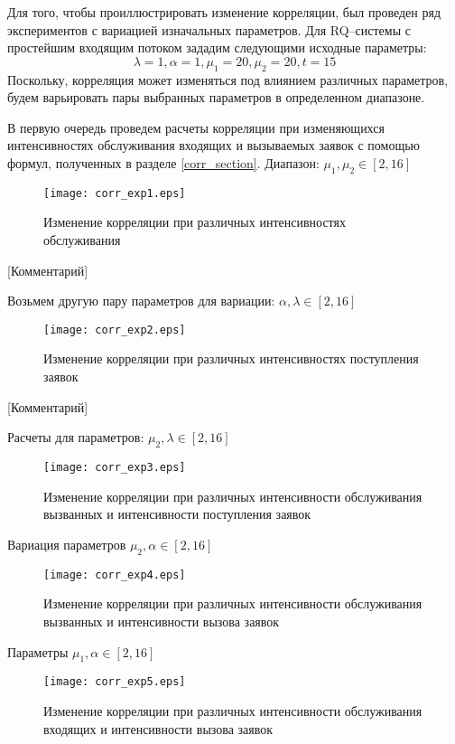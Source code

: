 Для того, чтобы проиллюстрировать изменение корреляции, был проведен ряд экспериментов с вариацией изначальных параметров.
Для RQ--системы с простейшим входящим потоком зададим следующими исходные параметры:
\begin{equation*} \label{simple_summary_input_params_corr}
	\lambda = 1,
	\alpha = 1,
	\mu_{1} = 20,
	\mu_{2} = 20, 
	t = 15
\end{equation*}
Поскольку, корреляция может изменяться под влиянием различных параметров, будем варьировать пары выбранных параметров в определенном диапазоне.

В первую очередь проведем расчеты корреляции при изменяющихся интенсивностях обслуживания входящих и вызываемых заявок с помощью формул, полученных в разделе \ref{corr_section}. Диапазон: $\mu_{1},\mu_{2} \in [2,16]$

\begin{figure}[H]
	\centering
	\texttt{[image: corr\_exp1.eps]}
	\caption{Изменение корреляции при различных интенсивностях обслуживания}
	\label{exps_corr_exp1}
\end{figure} 

[Комментарий]

Возьмем другую пару параметров для вариации: $\alpha,\lambda \in [2,16]$

\begin{figure}[H]
	\centering
	\texttt{[image: corr\_exp2.eps]}
	\caption{Изменение корреляции при различных интенсивностях поступления заявок}
	\label{exps_corr_exp2}
\end{figure} 

[Комментарий]

Расчеты для параметров: $\mu_{2},\lambda \in [2,16]$
\begin{figure}[H]
	\centering
	\texttt{[image: corr\_exp3.eps]}
	\caption{Изменение корреляции при различных интенсивности обслуживания вызванных и интенсивности поступления заявок}
	\label{exps_corr_exp3}
\end{figure} 

Вариация параметров $\mu_{2},\alpha \in [2,16]$
\begin{figure}[H]
	\centering
	\texttt{[image: corr\_exp4.eps]}
	\caption{Изменение корреляции при различных интенсивности обслуживания вызванных и интенсивности вызова заявок}
	\label{exps_corr_exp4}
\end{figure} 

Параметры $\mu_{1},\alpha \in [2,16]$
\begin{figure}[H]
	\centering
	\texttt{[image: corr\_exp5.eps]}
	\caption{Изменение корреляции при различных интенсивности обслуживания входящих и интенсивности вызова заявок}
	\label{exps_corr_exp5б}
\end{figure} 

